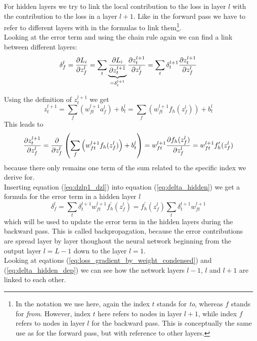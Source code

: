 For hidden layers we try to link the local contribution to the loss in layer $l$ with the
contribution to the loss in a layer $l+1$. Like in the forward pass we have to refer to
different layers with in the formulas to link them\footnote{In the notation we use here,
again the index $t$ stands for \emph{to}, whereas $f$ stands for \emph{from}. However,
index $t$ here refers to nodes in layer $l+1$, while index $f$ refers to nodes in layer
$l$ for the backward pass. This is conceptually the same use as for the forward pass, but
with reference to other layers.}. \\

Looking at the error term and using the chain rule again we can find a link between
different layers:
\begin{equation}
    \delta_f^l = \frac{\partial {L_i}}{\partial {z_f^l}}
    = \sum\limits_t \underbrace{\frac{\partial {L_i}}{\partial {z_t^{l+1}}}}_{= \delta_t^{l+1}} \frac{\partial {z_t^{l+1}}}{\partial {z_f^l}} 
    = \sum\limits_t \delta_t^{l+1} \frac{\partial {z_t^{l+1}}}{\partial {z_f^l}}
    \label{eq:delta_hidden}
\end{equation} 

Using the definition of $z_t^{l+1}$ we get
\begin{equation}
    z_t^{l+1} = \sum\limits_f \left( w_{ft}^{l+1} a_f^l \right) + b_t^l
    = \sum\limits_f \left( w_{ft}^{l+1} f_h( z_f^l ) \right) + b_t^l
\end{equation}
This leads to
\begin{equation}
    \frac{\partial {z_t^{l+1}}}{\partial {z_f^l}}
    = \frac{\partial {}}{\partial {z_f^l}} \left( \sum\limits_f \left( w_{ft}^{l+1} f_h( z_f^l ) \right) + b_t^l \right)
    = w_{ft}^{l+1} \frac{\partial {f_h( z_f^l )}}{\partial {z_f^l}}
    = w_{ft}^{l+1} f_h^\prime( z_f^l )
    \label{eq:dzlp1_dzl}
\end{equation}
because there only remains one term of the sum related to the specific index we derive
for. \\

Inserting equation (\ref{eq:dzlp1_dzl}) into equation (\ref{eq:delta_hidden}) we get a
formula for the error term in a hidden layer $l$
\begin{equation}
    \delta_f^l = \sum\limits_t \delta_t^{l+1} w_{ft}^{l+1} f_h^\prime( z_f^l )
    = f_h^\prime( z_f^l ) \sum\limits_t \delta_t^{l+1} w_{ft}^{l+1}
    \label{eq:delta_hidden_dep}
\end{equation}
which will be used to update the error term in the hidden layers during the backward pass.
This is called backpropagation, because the error contributions are spread layer by layer
thoughout the neural network beginning from the output layer $l=L-1$ down to the layer
$l=1$. \\

Looking at eqations (\ref{eq:loss_gradient_by_weight_condensed}) and
(\ref{eq:delta_hidden_dep}) we can see how the network layers $l-1$, $l$ and $l+1$ are
linked to each other.

\newpage